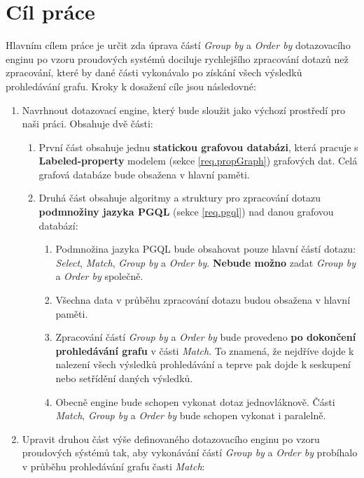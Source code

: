 \section*{Cíl práce}

Hlavním cílem práce je určit zda úprava částí \textit{Group by} a \textit{Order by} dotazovacího enginu po vzoru proudových systémů dociluje rychlejšího zpracování dotazů než zpracování, které by dané části vykonávalo po získání všech výsledků prohledávání grafu.
Kroky k dosažení cíle jsou následovné:
\begin{enumerate}
\item
Navrhnout dotazovací engine, který bude sloužit jako výchozí prostředí pro naši práci.
Obsahuje dvě části:
\begin{enumerate}
\item První část obsahuje jednu \textbf{statickou grafovou databázi}, která pracuje s \textbf{Labeled-property} modelem (sekce \ref{req.propGraph}) grafových dat.
Celá grafová databáze bude obsažena v hlavní paměti.

\item Druhá část obsahuje algoritmy a struktury pro zpracování dotazu \textbf{podmnožiny jazyka PGQL} (sekce \ref{req.pgql}) nad danou grafovou databází:
    \begin{enumerate}
    \item Podmnožina jazyka PGQL bude obsahovat pouze hlavní částí dotazu: \textit{Select}, \textit{Match}, \textit{Group by} a \textit{Order by}.
    \textbf{Nebude možno} zadat \textit{Group by} a \textit{Order by} společně.
    \item Všechna data v průběhu zpracování dotazu budou obsažena v hlavní paměti.
    \item Zpracování částí \textit{Group by} a \textit{Order by} bude provedeno \textbf{po dokončení prohledávání grafu} v části \textit{Match}.
    To znamená, že nejdříve dojde k nalezení všech výsledků prohledávání a teprve pak dojde k seskupení nebo setřídění daných výsledků.
    \item Obecně engine bude schopen vykonat dotaz jednovláknově.
    Části \textit{Match}, \textit{Group by} a \textit{Order by} bude schopen vykonat i paralelně.
    \end{enumerate}
\end{enumerate}

\item
Upravit druhou část výše definovaného dotazovacího enginu po vzoru proudových sýstémů tak, aby vykonávání částí \textit{Group by} a \textit{Order by} probíhalo v průběhu prohledávání grafu časti \textit{Match}:
\begin{enumerate}


\end{enumerate}
\end{enumerate}
